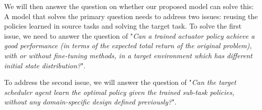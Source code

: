 We will then answer the question on whether our proposed model can solve this:
A model that solves the primary question needs to address two issues: reusing the policies learned in source tasks and solving the target task.
To solve the first issue, we need to answer the question of "\textit{Can a trained actuator policy achieve a good performance (in terms of the expected total return of the original problem), with or without fine-tuning methods, in a target environment which has different initial state distribution?}".

To address the second issue, we will answer the question of "\textit{Can the target scheduler agent learn the optimal policy given the trained sub-task policies, without any domain-specific design defined previously?}".

